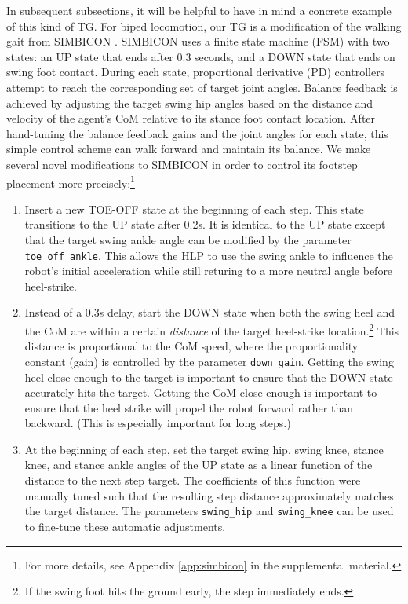 \documentclass[conference]{IEEEtran}
\begin{document}
In subsequent subsections, it will be helpful to have in mind a concrete example of this kind of TG.
For biped locomotion, our TG is a modification of the walking gait from SIMBICON \citep{yin2007simbicon}.
SIMBICON uses a finite state machine (FSM) with two states: an UP state that ends after 0.3 seconds, and a DOWN state that ends on swing foot contact.
During each state, proportional derivative (PD) controllers attempt to reach the corresponding set of target joint angles.
Balance feedback is achieved by adjusting the target swing hip angles based on the distance and velocity of the agent's CoM relative to its stance foot contact location.
After hand-tuning the balance feedback gains and the joint angles for each state, this simple control scheme can walk forward and maintain its balance.
We make several novel modifications to SIMBICON in order to control its footstep placement more precisely:\footnote{
For more details, see Appendix \ref{app:simbicon} in the supplemental material.}
\begin{enumerate}
  \item Insert a new TOE-OFF state at the beginning of each step.
    This state transitions to the UP state after 0.2s.
    It is identical to the UP state except that the target swing ankle angle can be modified by the parameter \texttt{toe\_off\_ankle}.
    This allows the HLP to use the swing ankle to influence the robot's initial acceleration while still returing to a more neutral angle before heel-strike.

  \item Instead of a 0.3s delay, start the DOWN state when both the swing heel and the CoM are within a certain \emph{distance} of the target heel-strike location.\footnote{
    If the swing foot hits the ground early, the step immediately ends.}
    This distance is proportional to the CoM speed, where the proportionality constant (gain) is controlled by the parameter \texttt{down\_gain}.
    Getting the swing heel close enough to the target is important to ensure that the DOWN state accurately hits the target.
    Getting the CoM close enough is important to ensure that the heel strike will propel the robot forward rather than backward.
    (This is especially important for long steps.)

  \item At the beginning of each step, set the target swing hip, swing knee, stance knee, and stance ankle angles of the UP state as a linear function of the distance to the next step target.
    The coefficients of this function were manually tuned such that the resulting step distance approximately matches the target distance.
    The parameters \texttt{swing\_hip} and \texttt{swing\_knee} can be used to fine-tune these automatic adjustments.
\end{enumerate}
\end{document}
